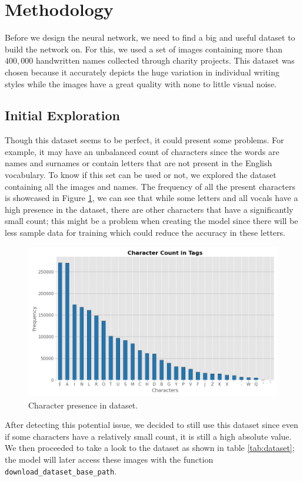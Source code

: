 \documentclass[11pt,letterpaper]{article}
\begin{document}
	\section{Methodology}
	Before we design the neural network, we need to find a big and useful dataset to build the network on. For this, we used a set of images \cite{handwriting-dataset} containing more than $400,000$ handwritten names collected through charity projects. This dataset was chosen because it accurately depicts the huge variation in individual writing styles while the images have a great quality with none to little visual noise.
	
	\subsection{Initial Exploration}
	Though this dataset seems to be perfect, it could present some problems. For example, it may have an unbalanced count of characters since the words are names and surnames or contain letters that are not present in the English vocabulary. To know if this set can be used or not, we explored the dataset containing all the images and names. The frequency of all the present characters is showcased in Figure \ref{fig:char_freq}, we can see that while some letters and all vocals have a high presence in the dataset, there are other characters that have a significantly small count; this might be a problem when creating the model since there will be less sample data for training which could reduce the accuracy in these letters.
	
	\begin{figure}[h]
		\centering
		\includegraphics[width=0.65\linewidth]{character_count.png}
		\caption{Character presence in dataset.}
		\label{fig:char_freq}
	\end{figure}
	
	After detecting this potential issue, we decided to still use this dataset since even if some characters have a relatively small count, it is still a high absolute value. We then proceeded to take a look to the dataset as shown in table \ref{tab:dataset}; the model will later access these images with the function \texttt{download\_dataset\_base\_path}.
	
\end{document}
